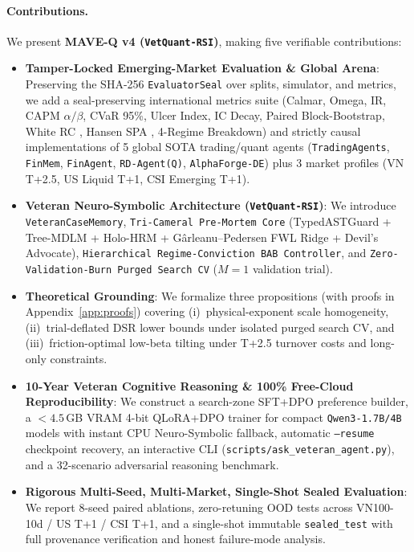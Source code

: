 \documentclass[11pt]{article}
\begin{document}
\paragraph{Contributions.} We present \textbf{MAVE-Q v4 (\texttt{VetQuant-RSI})}, making five verifiable contributions:
\begin{itemize}[leftmargin=1.4em]
  \item \textbf{Tamper-Locked Emerging-Market Evaluation \& Global Arena}: Preserving the SHA-256 \texttt{EvaluatorSeal} over splits, simulator, and metrics, we add a seal-preserving international metrics suite (Calmar, Omega, IR, CAPM $\alpha/\beta$, CVaR 95\%, Ulcer Index, IC Decay, Paired Block-Bootstrap, White RC \citealt{white2000reality}, Hansen SPA \citealt{hansen2005spa}, 4-Regime Breakdown) and strictly causal implementations of 5 global SOTA trading/quant agents (\texttt{TradingAgents}, \texttt{FinMem}, \texttt{FinAgent}, \texttt{RD-Agent(Q)}, \texttt{AlphaForge-DE}) plus 3 market profiles (VN T+2.5, US Liquid T+1, CSI Emerging T+1).
  \item \textbf{Veteran Neuro-Symbolic Architecture (\texttt{VetQuant-RSI})}: We introduce \texttt{VeteranCaseMemory}, \texttt{Tri-Cameral Pre-Mortem Core} (TypedASTGuard + Tree-MDLM + Holo-HRM + G\^arleanu--Pedersen FWL Ridge + Devil's Advocate), \texttt{Hierarchical Regime-Conviction BAB Controller}, and \texttt{Zero-Validation-Burn Purged Search CV} ($M=1$ validation trial).
  \item \textbf{Theoretical Grounding}: We formalize three propositions (with proofs in Appendix~\ref{app:proofs}) covering (i)~physical-exponent scale homogeneity, (ii)~trial-deflated DSR lower bounds under isolated purged search CV, and (iii)~friction-optimal low-beta tilting under T+2.5 turnover costs and long-only constraints.
  \item \textbf{10-Year Veteran Cognitive Reasoning \& 100\% Free-Cloud Reproducibility}: We construct a search-zone SFT+DPO preference builder, a $<4.5$\,GB VRAM 4-bit QLoRA+DPO trainer \citep{dettmers2023qlora,rafailov2023dpo} for compact \texttt{Qwen3-1.7B/4B} models \citep{yang2025qwen3} with instant CPU Neuro-Symbolic fallback, automatic \texttt{--resume} checkpoint recovery, an interactive CLI (\texttt{scripts/ask\_veteran\_agent.py}), and a 32-scenario adversarial reasoning benchmark.
  \item \textbf{Rigorous Multi-Seed, Multi-Market, Single-Shot Sealed Evaluation}: We report 8-seed paired ablations, zero-retuning OOD tests across VN100-10d / US T+1 / CSI T+1, and a single-shot immutable \texttt{sealed\_test} with full provenance verification and honest failure-mode analysis.
\end{itemize}
\end{document}

